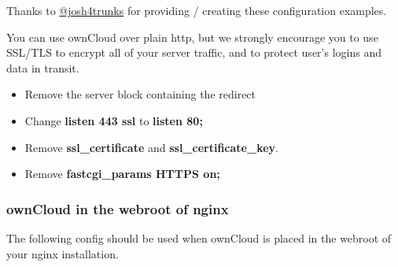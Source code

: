 \documentclass[letterpaper,10pt,english]{sphinxmanual}
\begin{document}
Thanks to \href{https://github.com/josh4trunks}{@josh4trunks} for providing /
creating these configuration examples.

You can use ownCloud over plain http, but we strongly encourage you to use
SSL/TLS to encrypt all of your server traffic, and to protect user's logins and
data in transit.
\begin{itemize}
\item {} 
Remove the server block containing the redirect

\item {} 
Change \textbf{listen 443 ssl} to \textbf{listen 80;}

\item {} 
Remove \textbf{ssl\_certificate} and \textbf{ssl\_certificate\_key}.

\item {} 
Remove \textbf{fastcgi\_params HTTPS on;}

\end{itemize}


\subsubsection{ownCloud in the webroot of nginx}
\label{installation/nginx_examples:owncloud-in-the-webroot-of-nginx}
The following config should be used when ownCloud is placed in the webroot of
your nginx installation.
\end{document}
